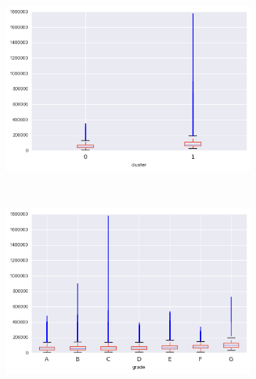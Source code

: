 \begin{apendicesenv}
\begin{figure}[t!]
\begin{subfigure}[t]{0.5\textwidth}
			\centerline{\includegraphics[width=1\textwidth]{img/annual_inc_by_cluster}}
    	\end{subfigure}%
    	~ 
    	\begin{subfigure}[t]{0.5\textwidth}
    		\centering
   
			\centerline{\includegraphics[width=1\textwidth]{img/annual_inc_by_grade}}

    	\end{subfigure}
    	\\
    	        \caption{delinq\textunderscore 2yrs}
    	\begin{subfigure}[t]{0.5\textwidth}
    		\centering


\end{subfigure}
\end{figure}
\end{apendicesenv}
